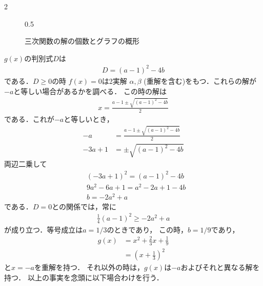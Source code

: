 \documentclass[../../main.tex]{subfiles}
\begin{document}
\begin{multicols}{2}
\begin{figure}[H]
\begin{subcaptionblock}{0.5\linewidth}
    \end{subcaptionblock}
    \caption{三次関数の解の個数とグラフの概形}
    \label{2000-1:fig:1}
  \end{figure}

  $g(x)$の判別式$D$は
  \begin{align*}
    D=(a-1)^2-4b
  \end{align*}
  である．$D\ge0$の時 $f(x)=0$は2実解 $\alpha, \beta$ (重解を含む)をもつ．これらの解が$-a$と等しい場合があるかを調べる．
  この時の解は
  \begin{align}
    x = \frac{a-1 \pm \sqrt{(a-1)^2-4b}}{2}\label{2000-1:eq:2}
  \end{align}
  である．これが$-a$と等しいとき，
  \begin{align*}
    -a      & = \frac{a-1 \pm \sqrt{(a-1)^2-4b}}{2} \\
    -3a + 1 & = \pm \sqrt{(a-1)^2-4b}
  \end{align*}
  両辺二乗して
  \begin{align}
     & (-3a+1)^2 = (a-1)^2-4b   \nonumber \\
     & 9a^2-6a+1 = a^2-2a+1 -4b \nonumber \\
     & b = - 2a^2+a \label{2000-1:eq:3}
  \end{align}
  である．$D=0$との関係では，常に
  \begin{align*}
    \frac{1}{4}(a-1)^2 \ge -2a^2+a
  \end{align*}
  が成り立つ．等号成立は$a=1/3$のときであり，
  この時，$b=1/9$であり，
  \begin{align*}
    g(x)
     & = x^2+\frac{2}{3}x+\frac{1}{9} \\
     & = \left(x+\frac{1}{3}\right)^2
  \end{align*}
  と$x=-a$を重解を持つ．
  それ以外の時は，$g(x)$は$-a$およびそれと異なる解を持つ．
  以上の事実を念頭に以下場合わけを行う．


\end{multicols}
\end{document}
